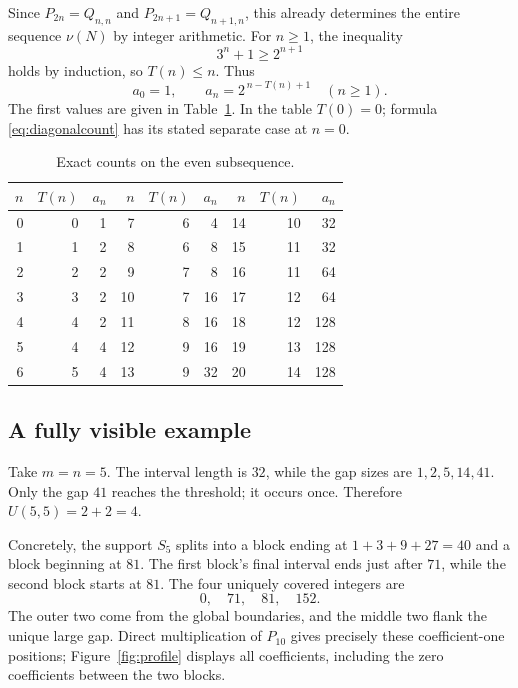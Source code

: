 \documentclass[11pt,letterpaper]{article}
\numberwithin{equation}{section}
\theoremstyle{definition}
\theoremstyle{remark}
\begin{document}
Since $P_{2n}=Q_{n,n}$ and $P_{2n+1}=Q_{n+1,n}$, this already determines
the entire sequence $\nu(N)$ by integer arithmetic.
For $n\ge1$, the inequality
\begin{equation}\label{eq:diagonalthreshold}
 3^n+1\ge2^{n+1}
\end{equation}
holds by induction, so $T(n)\le n$. Thus
\begin{equation}\label{eq:diagonalcount}
 a_0=1,\qquad a_n=2^{\,n-T(n)+1}\quad(n\ge1).
\end{equation}
The first values are given in Table~\ref{tab:terms}. In the table $T(0)=0$;
formula \eqref{eq:diagonalcount} has its stated separate case at $n=0$.

\begin{table}[htbp]
\centering
\caption{Exact counts on the even subsequence.}\label{tab:terms}
\begin{tabular}{rrr@{\qquad}rrr@{\qquad}rrr}
\toprule
$n$&$T(n)$&$a_n$&$n$&$T(n)$&$a_n$&$n$&$T(n)$&$a_n$\\
\midrule
0&0&1&  7&6&4& 14&10&32\\
1&1&2&  8&6&8& 15&11&32\\
2&2&2&  9&7&8& 16&11&64\\
3&3&2& 10&7&16& 17&12&64\\
4&4&2& 11&8&16& 18&12&128\\
5&4&4& 12&9&16& 19&13&128\\
6&5&4& 13&9&32& 20&14&128\\
\bottomrule
\end{tabular}
\end{table}

\subsection{A fully visible example}
Take $m=n=5$. The interval length is $32$, while the gap sizes are
$1,2,5,14,41$. Only the gap $41$ reaches the threshold; it occurs once.
Therefore $U(5,5)=2+2=4$.

Concretely, the support $S_5$ splits into a block ending at
$1+3+9+27=40$ and a block beginning at $81$. The first block's final
interval ends just after $71$, while the second block starts at $81$.
The four uniquely covered integers are
\begin{equation}\label{eq:examplelocations}
 0,\quad71,\quad81,\quad152.
\end{equation}
The outer two come from the global boundaries, and the middle two flank
the unique large gap. Direct multiplication of $P_{10}$ gives precisely
these coefficient-one positions; Figure~\ref{fig:profile} displays all
coefficients, including the zero coefficients between the two blocks.
\end{document}
